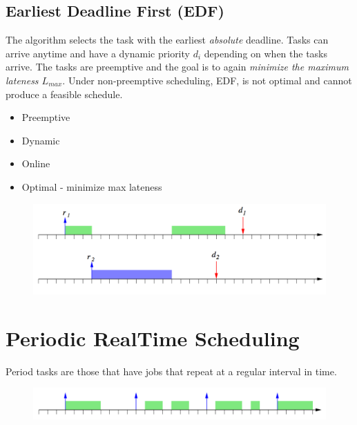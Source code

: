 \documentclass{hw}
\begin{document}
\subsection{Earliest Deadline First (EDF)}
The algorithm selects the task with the earliest \emph{absolute} deadline. Tasks
can arrive anytime and have a dynamic priority $d_{i}$ depending on when the 
tasks arrive. The tasks are preemptive and the goal is to again \emph{minimize 
the maximum lateness $L_{max}$}. Under non-preemptive scheduling, EDF, is not
optimal and cannot produce a feasible schedule.
\begin{itemize}
  \item Preemptive
  \item Dynamic
  \item Online
  \item Optimal - minimize max lateness
\end{itemize}
\begin{figure}[H]
  \centering
  \includegraphics[scale=.6]{img/edf}
\end{figure}


\section{Periodic Real\-Time Scheduling}
Period tasks are those that have jobs that repeat at a regular interval in time.
\begin{figure}[H]
  \centering
  \includegraphics[scale=.6]{img/period}
\end{figure}
\end{document}
